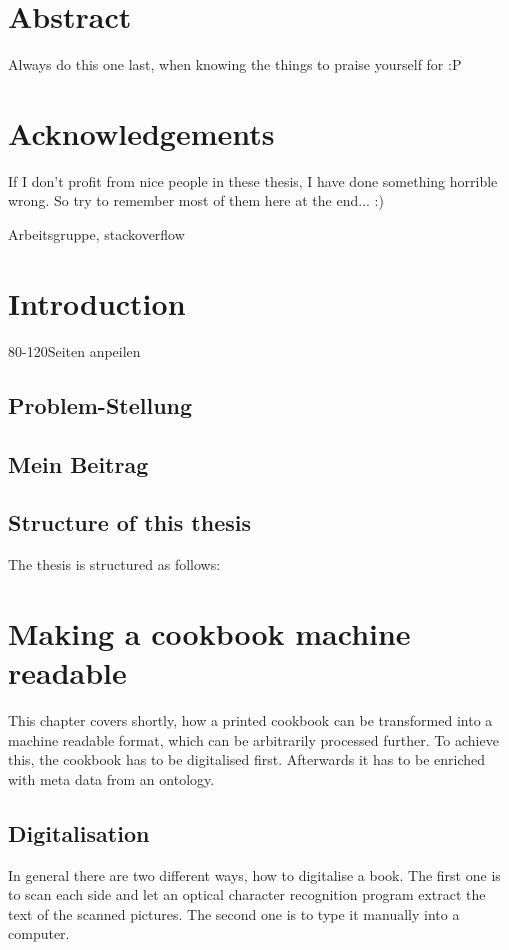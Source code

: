 \documentclass[12pt, twoside]{report}
\begin{document}
\chapter*{Abstract}
Always do this one last, when knowing the things to praise  yourself for :P

\chapter*{Acknowledgements}
If I don't profit from nice people in these thesis, I have done something horrible wrong. So try to remember most of them here at the end... :)

Arbeitsgruppe, stackoverflow
\tableofcontents

\listoffigures
\begingroup
	\let\clearpage\relax
	\listoftables
\endgroup

\clearpage
{}  
\chapter{Introduction}
80-120Seiten anpeilen
\section{Problem-Stellung}
\section{Mein Beitrag}
\section{Structure of this thesis}
The thesis is structured as follows:




\chapter{Making a cookbook machine readable}
This chapter covers shortly, how a printed cookbook can be transformed into a machine readable format, which can be arbitrarily processed further. To achieve this, the cookbook has to be digitalised first. Afterwards it has to be enriched with meta data from an ontology.

\section{Digitalisation}
In general there are two different ways, how to digitalise a book. The first one is to scan each side and let an optical character recognition program extract the text of the scanned pictures. The second one is to type it manually into a computer.
\end{document}
